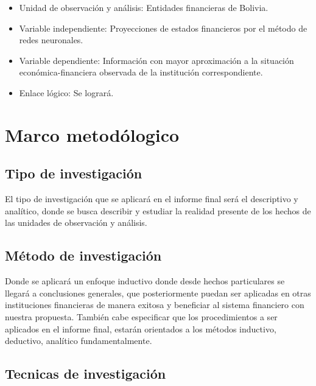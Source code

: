 \documentclass[
  12pt,
]{article}
\providecommand{\tightlist}{%
  \setlength{\itemsep}{0pt}\setlength{\parskip}{0pt}}
\begin{document}
\begin{itemize}
\tightlist
\item
  Unidad de observación y análisis: Entidades financieras de Bolivia.
\item
  Variable independiente: Proyecciones de estados financieros por el
  método de redes neuronales.
\item
  Variable dependiente: Información con mayor aproximación a la
  situación económica-financiera observada de la institución
  correspondiente.
\item
  Enlace lógico: Se logrará.
\end{itemize}

\hypertarget{marco-metoduxf3logico}{%
\section{Marco metodólogico}\label{marco-metoduxf3logico}}

\hypertarget{tipo-de-investigaciuxf3n}{%
\subsection{Tipo de investigación}\label{tipo-de-investigaciuxf3n}}

El tipo de investigación que se aplicará en el informe final será el
descriptivo y analítico, donde se busca describir y estudiar la realidad
presente de los hechos de las unidades de observación y análisis.

\hypertarget{muxe9todo-de-investigaciuxf3n}{%
\subsection{Método de
investigación}\label{muxe9todo-de-investigaciuxf3n}}

Donde se aplicará un enfoque inductivo donde desde hechos particulares
se llegará a conclusiones generales, que posteriormente puedan ser
aplicadas en otras instituciones financieras de manera exitosa y
beneficiar al sistema financiero con nuestra propuesta. También cabe
especificar que los procedimientos a ser aplicados en el informe final,
estarán orientados a los métodos inductivo, deductivo, analítico
fundamentalmente.

\hypertarget{tecnicas-de-investigaciuxf3n}{%
\subsection{Tecnicas de
investigación}\label{tecnicas-de-investigaciuxf3n}}
\end{document}
